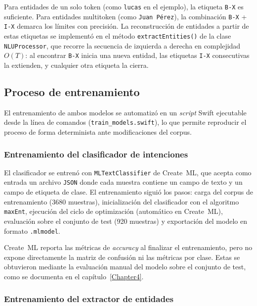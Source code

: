 Para entidades de un solo token (como \texttt{lucas} en el ejemplo), la etiqueta \texttt{B-X} es suficiente. Para entidades multitoken (como \texttt{Juan Pérez}), la combinación \texttt{B-X} + \texttt{I-X} demarca los límites con precisión. La reconstrucción de entidades a partir de estas etiquetas se implementó en el método \texttt{extract\-Entities()} de la clase \texttt{NLU\-Processor}, que recorre la secuencia de izquierda a derecha en complejidad $O(T)$: al encontrar \texttt{B-X} inicia una nueva entidad, las etiquetas \texttt{I-X} consecutivas la extienden, y cualquier otra etiqueta la cierra.

\subsection{Proceso de entrenamiento}
\label{subsec:entrenamiento}

El entrenamiento de ambos modelos se automatizó en un \textit{script} Swift ejecutable desde la línea de comandos (\texttt{train\_models.swift}), lo que permite reproducir el proceso de forma determinista ante modificaciones del corpus.

\subsubsection{Entrenamiento del clasificador de intenciones}

El clasificador se entrenó con \texttt{MLText\-Classifier} de Create~ML, que acepta como entrada un archivo \texttt{JSON} donde cada muestra contiene un campo de texto y un campo de etiqueta de clase. El entrenamiento siguió los pasos: carga del corpus de entrenamiento (3680 muestras), inicialización del clasificador con el algoritmo \texttt{maxEnt}, ejecución del ciclo de optimización (automático en Create~ML), evaluación sobre el conjunto de test (920 muestras) y exportación del modelo en formato \texttt{.mlmodel}.

Create~ML reporta las métricas de \textit{accuracy} al finalizar el entrenamiento, pero no expone directamente la matriz de confusión ni las métricas por clase. Estas se obtuvieron mediante la evaluación manual del modelo sobre el conjunto de test, como se documenta en el capítulo~\ref{Chapter4}.

\subsubsection{Entrenamiento del extractor de entidades}

